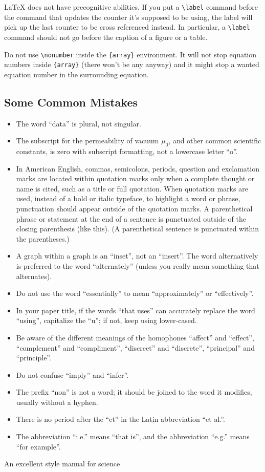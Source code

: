 \documentclass[conference]{IEEEtran}
\begin{document}
{\LaTeX} does not have precognitive abilities. If you put a
\verb|\label| command before the command that updates the counter it's
supposed to be using, the label will pick up the last counter to be
cross referenced instead. In particular, a \verb|\label| command
should not go before the caption of a figure or a table.

Do not use \verb|\nonumber| inside the \verb|{array}| environment. It
will not stop equation numbers inside \verb|{array}| (there won't be
any anyway) and it might stop a wanted equation number in the
surrounding equation.

\subsection{Some Common Mistakes}\label{SCM}
\begin{itemize}
\item The word ``data'' is plural, not singular.
\item The subscript for the permeability of vacuum $\mu_{0}$, and other common scientific constants, is zero with subscript formatting, not a lowercase letter ``o''.
\item In American English, commas, semicolons, periods, question and exclamation marks are located within quotation marks only when a complete thought or name is cited, such as a title or full quotation. When quotation marks are used, instead of a bold or italic typeface, to highlight a word or phrase, punctuation should appear outside of the quotation marks. A parenthetical phrase or statement at the end of a sentence is punctuated outside of the closing parenthesis (like this). (A parenthetical sentence is punctuated within the parentheses.)
\item A graph within a graph is an ``inset'', not an ``insert''. The word alternatively is preferred to the word ``alternately'' (unless you really mean something that alternates).
\item Do not use the word ``essentially'' to mean ``approximately'' or ``effectively''.
\item In your paper title, if the words ``that uses'' can accurately replace the word ``using'', capitalize the ``u''; if not, keep using lower-cased.
\item Be aware of the different meanings of the homophones ``affect'' and ``effect'', ``complement'' and ``compliment'', ``discreet'' and ``discrete'', ``principal'' and ``principle''.
\item Do not confuse ``imply'' and ``infer''.
\item The prefix ``non'' is not a word; it should be joined to the word it modifies, usually without a hyphen.
\item There is no period after the ``et'' in the Latin abbreviation ``et al.''.
\item The abbreviation ``i.e.'' means ``that is'', and the abbreviation ``e.g.'' means ``for example''.
\end{itemize}
An excellent style manual for science
\end{document}
